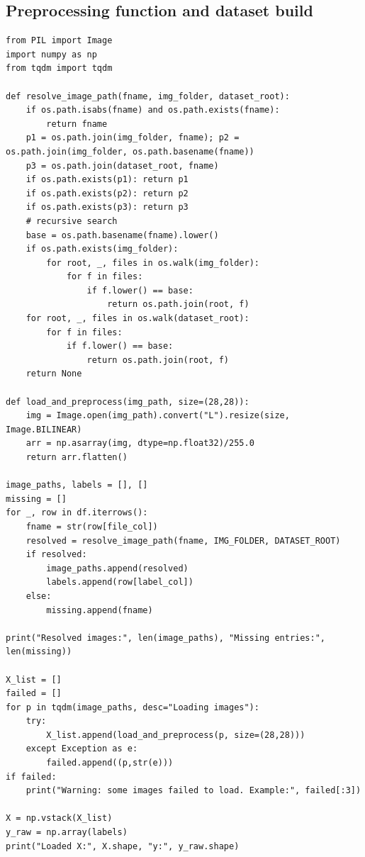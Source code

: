 \documentclass[11pt,a4paper]{article}
\begin{document}
\subsection{Preprocessing function and dataset build}
\begin{lstlisting}[caption={Image preprocessing and building X,y arrays}]
from PIL import Image
import numpy as np
from tqdm import tqdm

def resolve_image_path(fname, img_folder, dataset_root):
    if os.path.isabs(fname) and os.path.exists(fname):
        return fname
    p1 = os.path.join(img_folder, fname); p2 = os.path.join(img_folder, os.path.basename(fname))
    p3 = os.path.join(dataset_root, fname)
    if os.path.exists(p1): return p1
    if os.path.exists(p2): return p2
    if os.path.exists(p3): return p3
    # recursive search
    base = os.path.basename(fname).lower()
    if os.path.exists(img_folder):
        for root, _, files in os.walk(img_folder):
            for f in files:
                if f.lower() == base:
                    return os.path.join(root, f)
    for root, _, files in os.walk(dataset_root):
        for f in files:
            if f.lower() == base:
                return os.path.join(root, f)
    return None

def load_and_preprocess(img_path, size=(28,28)):
    img = Image.open(img_path).convert("L").resize(size, Image.BILINEAR)
    arr = np.asarray(img, dtype=np.float32)/255.0
    return arr.flatten()

image_paths, labels = [], []
missing = []
for _, row in df.iterrows():
    fname = str(row[file_col])
    resolved = resolve_image_path(fname, IMG_FOLDER, DATASET_ROOT)
    if resolved:
        image_paths.append(resolved)
        labels.append(row[label_col])
    else:
        missing.append(fname)

print("Resolved images:", len(image_paths), "Missing entries:", len(missing))

X_list = []
failed = []
for p in tqdm(image_paths, desc="Loading images"):
    try:
        X_list.append(load_and_preprocess(p, size=(28,28)))
    except Exception as e:
        failed.append((p,str(e)))
if failed:
    print("Warning: some images failed to load. Example:", failed[:3])

X = np.vstack(X_list)
y_raw = np.array(labels)
print("Loaded X:", X.shape, "y:", y_raw.shape)
\end{lstlisting}
\end{document}
